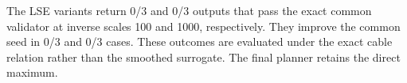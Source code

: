 The LSE variants return 0/3 and 0/3 outputs that pass the exact common validator at inverse scales 100 and 1000, respectively. They improve the common seed in 0/3 and 0/3 cases. These outcomes are evaluated under the exact cable relation rather than the smoothed surrogate. The final planner retains the direct maximum.
